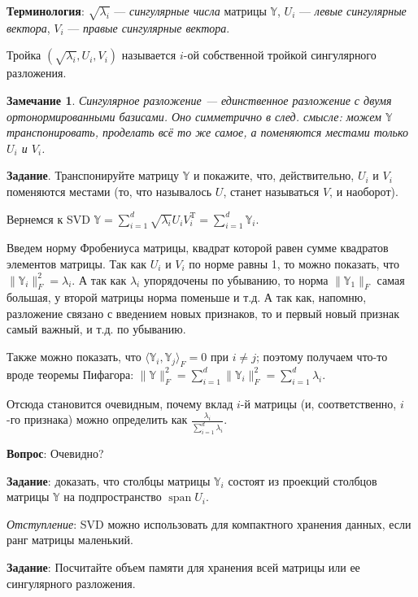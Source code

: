 \documentclass[specialist, 12pt,
subf, %
href, colorlinks=true,
substylefile = spbu.rtx,
]{disser}
\newtheorem{remark}{Замечание}
\DeclareMathOperator{\spn}{span}
\begin{document}
 \textbf{Терминология}: 
 		$\sqrt{\lambda_i}$ --- \textit{сингулярные числа} матрицы $\mathbb{Y}$, $U_i$ --- \textit{левые сингулярные вектора}, $V_i$ --- \textit{правые сингулярные вектора}.
 		
 	Тройка $(\sqrt{\lambda_i},U_i,V_i)$ называется $i$-ой собственной тройкой сингулярного разложения.

\begin{remark}
	Сингулярное разложение --- единственное разложение с двумя ортонормированными базисами. Оно симметрично в след. смысле: можем $\mathbb{Y}$ транспонировать, проделать всё то же самое, а поменяются местами только $U_i$ и $V_i$.
\end{remark}

\textbf{Задание}. Транспонируйте матрицу $\mathbb{Y}$ и покажите, что, действительно, $U_i$ и $V_i$ поменяются местами (то, что называлось $U$, станет называться $V$, и наоборот).

\medskip
Вернемся к SVD $\mathbb{Y} = \sum\limits_{i = 1}^d \sqrt{\lambda_i} U_i V_i^{\mathrm{T}} = \sum\limits_{i = 1}^d \mathbb{Y}_i$.

Введем норму Фробениуса матрицы, квадрат которой равен сумме квадратов элементов матрицы. Так как $U_i$ и $V_i$ по норме равны 1, то можно показать, что $\|\mathbb{Y}_i\|_F^2 = \lambda_i$.  А так как $\lambda_i$ упорядочены по убыванию, то  норма $\|\mathbb{Y}_1\|_F$ самая большая, у второй матрицы норма поменьше и т.д.
А так как, напомню, разложение связано с введением новых признаков, то и первый новый признак самый важный, и т.д. по убыванию.

Также можно показать, что $\langle \mathbb{Y}_i, \mathbb{Y}_j\rangle_F = 0$ при $i\neq j$; поэтому получаем что-то вроде теоремы Пифагора: $\|\mathbb{Y}\|_F^2 = \sum\limits_{i = 1}^d \|\mathbb{Y}_i\|_F^2 = \sum\limits_{i = 1}^d \lambda_i$.

Отсюда становится очевидным, почему вклад $i$-й матрицы (и, соответственно, $i$-го признака) можно определить как $\displaystyle\frac{\lambda_i}{\sum_{i=1}^d \lambda_i}$.

\textbf{Вопрос}: Очевидно?

\textbf{Задание}: доказать, что столбцы матрицы $\mathbb{Y}_i$ состоят из проекций столбцов матрицы $\mathbb{Y}$ на подпространство $\spn{U_i}$.


\textit{Отступление}: SVD можно использовать для компактного хранения данных, если ранг матрицы маленький. 

\textbf{Задание}: Посчитайте объем памяти для хранения всей матрицы или ее сингулярного разложения. 
\end{document}
